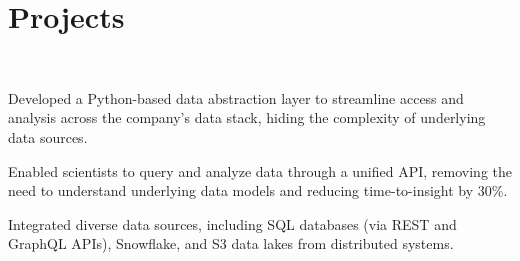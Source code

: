 \documentclass[]{resume}
\begin{document}
\begin{minipage}[t]{0.69\textwidth}





\section{Projects}

\\
\begin{tightemize}
    \item{Developed a Python-based data abstraction layer to streamline access and analysis across the company’s data stack, hiding the complexity of underlying data sources.}
    \item{Enabled scientists to query and analyze data through a unified API, removing the need to understand underlying data models and reducing time-to-insight by 30\%.}
    \item{Integrated diverse data sources, including SQL databases (via REST and GraphQL APIs), Snowflake, and S3 data lakes from distributed systems.}
\end{tightemize}
\sectionsep



\end{minipage}
\end{document}
